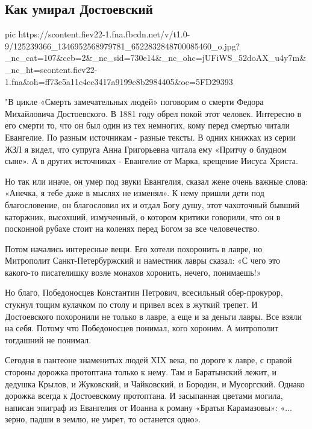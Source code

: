  
 
 

\subsection{Как умирал Достоевский}
\label{sec:13_11_2020.fb.evgeniy_maslov.1.dostoevskii_kak_umiral}

\ifcmt
pic https://scontent.fiev22-1.fna.fbcdn.net/v/t1.0-9/125239366_1346952568979781_6522832848700085460_o.jpg?_nc_cat=107&ccb=2&_nc_sid=730e14&_nc_ohc=jUFiWS_52doAX_u4y7m&_nc_ht=scontent.fiev22-1.fna&oh=ff73e5a11c4cc3417a9199e8b2984405&oe=5FD29393
\fi

"В цикле «Смерть замечательных людей» поговорим о смерти Федора Михайловича
Достоевского. В 1881 году обрел покой этот человек. Интересно в его смерти
то, что он был один из тех немногих, кому перед смертью читали Евангелие. По
разным источникам - разные тексты. В одних книжках из серии ЖЗЛ я видел, что
супруга Анна Григорьевна читала ему «Притчу о блудном сыне». А в других
источниках - Евангелие от Марка, крещение Иисуса Христа.

Но так или иначе, он умер под звуки Евангелия, сказал жене очень важные слова:
«Анечка, я тебе даже в мыслях не изменял». К нему пришли дети под
благословение, он благословил их и отдал Богу душу, этот чахоточный бывший
каторжник, высохший, измученный, о котором критики говорили, что он в посконной
рубахе стоит на коленях перед Богом за все человечество.

Потом начались интересные вещи. Его хотели похоронить в лавре, но Митрополит
Санкт-Петербуржский и наместник лавры сказал: «С чего это какого-то писателишку
возле монахов хоронить, нечего, понимаешь!»

Но благо, Победоносцев Константин Петрович, всесильный обер-прокурор, стукнул
тощим кулачком по столу и привел всех в жуткий трепет. И Достоевского
похоронили не только в лавре, а еще и за деньги лавры. Все взяли на себя.
Потому что Победоносцев понимал, кого хороним. А митрополит тогдашний не
понимал.

Сегодня в пантеоне знаменитых людей XIX века, по дороге к лавре, с правой
стороны дорожка протоптана только к нему. Там и Баратынский лежит, и дедушка
Крылов, и Жуковский, и Чайковский, и Бородин, и Мусоргский. Однако дорожка
всегда к Достоевскому протоптана. И засыпанная цветами могила, написан эпиграф
из Евангелия от Иоанна к роману «Братья Карамазовы»: «... зерно, падши в землю,
не умрет, то останется одно».

